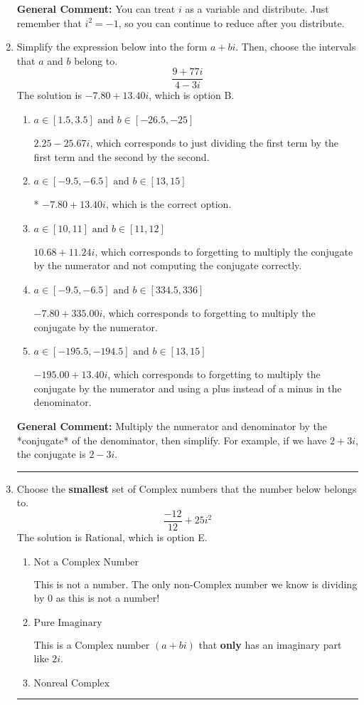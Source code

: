 \documentclass{extbook}[14pt]
\newcommand{\litem}[1]{\item #1

\rule{\textwidth}{0.4pt}}
\begin{document}
\begin{enumerate}
{\textbf{General Comment:} You can treat $i$ as a variable and distribute. Just remember that $i^2=-1$, so you can continue to reduce after you distribute.
}
\litem{
Simplify the expression below into the form $a+bi$. Then, choose the intervals that $a$ and $b$ belong to.
\[ \frac{9 + 77 i}{4 - 3 i} \]The solution is \( -7.80  + 13.40 i \), which is option B.\begin{enumerate}[label=\Alph*.]
\item \( a \in [1.5, 3.5] \text{ and } b \in [-26.5, -25] \)

 $2.25  - 25.67 i$, which corresponds to just dividing the first term by the first term and the second by the second.
\item \( a \in [-9.5, -6.5] \text{ and } b \in [13, 15] \)

* $-7.80  + 13.40 i$, which is the correct option.
\item \( a \in [10, 11] \text{ and } b \in [11, 12] \)

 $10.68  + 11.24 i$, which corresponds to forgetting to multiply the conjugate by the numerator and not computing the conjugate correctly.
\item \( a \in [-9.5, -6.5] \text{ and } b \in [334.5, 336] \)

 $-7.80  + 335.00 i$, which corresponds to forgetting to multiply the conjugate by the numerator.
\item \( a \in [-195.5, -194.5] \text{ and } b \in [13, 15] \)

 $-195.00  + 13.40 i$, which corresponds to forgetting to multiply the conjugate by the numerator and using a plus instead of a minus in the denominator.
\end{enumerate}

\textbf{General Comment:} Multiply the numerator and denominator by the *conjugate* of the denominator, then simplify. For example, if we have $2+3i$, the conjugate is $2-3i$.
}
\litem{
Choose the \textbf{smallest} set of Complex numbers that the number below belongs to.
\[ \frac{-12}{12}+25i^2 \]The solution is \( \text{Rational} \), which is option E.\begin{enumerate}[label=\Alph*.]
\item \( \text{Not a Complex Number} \)

This is not a number. The only non-Complex number we know is dividing by 0 as this is not a number!
\item \( \text{Pure Imaginary} \)

This is a Complex number $(a+bi)$ that \textbf{only} has an imaginary part like $2i$.
\item \( \text{Nonreal Complex} \)


\end{enumerate}}
\end{enumerate}
\end{document}
